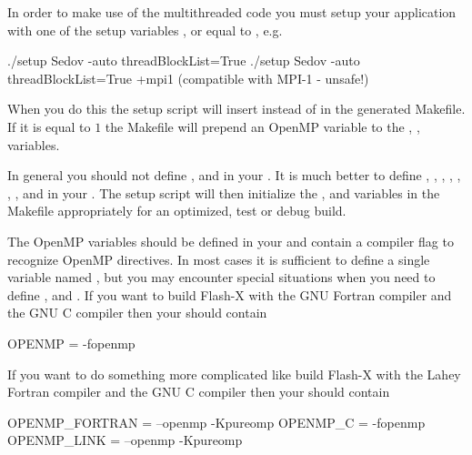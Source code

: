 In order to make use of the multithreaded code you must setup your
application with one of the setup variables ,
 or  equal to
, e.g.

\begin{codeseg}
./setup Sedov -auto threadBlockList=True
./setup Sedov -auto threadBlockList=True +mpi1 (compatible with MPI-1 - unsafe!)
\end{codeseg}


When you do this the setup script will insert 
instead of  in the generated Makefile.  If it is
equal to $1$ the Makefile will prepend an OpenMP variable to the
, ,  variables.


\begin{flashtip}
In general you should not define ,  and
 in your .  It is much better to define
, , ,
, , ,
,  and  in your
.  The setup script will then initialize the
,  and  variables in the
Makefile appropriately for an optimized, test or debug build.
\end{flashtip}

The OpenMP variables should be defined in your  and
contain a compiler flag to recognize OpenMP directives.  In most cases
it is sufficient to define a single variable named , but
you may encounter special situations when you need to define
,  and .  If you
want to build Flash-X with the GNU Fortran compiler  and
the GNU C compiler  then your  should
contain

\begin{codeseg}
OPENMP = -fopenmp
\end{codeseg}

If you want to do something more complicated like build Flash-X with the
Lahey Fortran compiler  and the GNU C compiler 
then your  should contain

\begin{codeseg}
OPENMP_FORTRAN = --openmp -Kpureomp
OPENMP_C = -fopenmp
OPENMP_LINK = --openmp -Kpureomp
\end{codeseg}


